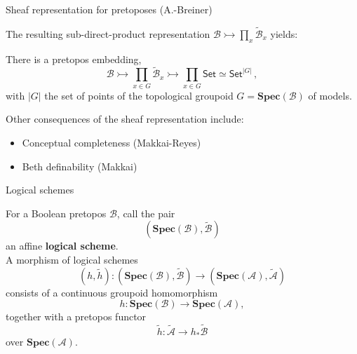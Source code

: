 \documentclass{beamer}
\newcommand{\B}{\ensuremath{\mathcal{B}}}
\newcommand{\myemph}[1]{\textbf{#1}}    %
\newcommand{\Set}{\mathsf{Set}}
\begin{document}
\begin{frame}{Sheaf representation for pretoposes (A.-Breiner)}

The resulting sub-direct-product representation $\mathcal{B}\rightarrowtail \prod_{x}\tilde{\mathcal{B}}_x$ yields:\\[1ex]

\begin{corollary} 
There is a pretopos embedding,
\[
\mathcal{B}\rightarrowtail \prod_{x\in G}\tilde{\mathcal{B}}_{x} \rightarrowtail \prod_{x\in G}\Set \simeq \Set^{|G|}\,,
\]
with $|G|$ the set of points of the topological groupoid $G = \mathbf{Spec}(\mathcal{B})$ of models.
\end{corollary}
\medskip

Other consequences of the sheaf representation include:

\begin{itemize}
\item Conceptual completeness (Makkai-Reyes)
\item Beth definability (Makkai)
\end{itemize}


\end{frame}
\begin{frame}{Logical schemes}

For a Boolean pretopos $\B$, call the pair $$(\mathbf{Spec}(\mathcal{B}), \tilde{\mathcal{B}})$$ an affine \myemph{logical scheme}.  \\

A morphism of logical schemes
\[
(h, \tilde{h}) : (\mathbf{Spec}(\mathcal{B}), \tilde{\mathcal{B}}) \to (\mathbf{Spec}(\mathcal{A}), \tilde{\mathcal{A}})
\]
consists of a continuous groupoid homomorphism 
\[
h : \mathbf{Spec}(\mathcal{B}) \to \mathbf{Spec}(\mathcal{A}),
\]
together with a pretopos functor 
\[
\tilde{h} : \tilde{\mathcal{A}} \to h_*\tilde{\mathcal{B}}
\]
over $\mathbf{Spec}(\mathcal{A})$.

\end{frame}
\end{document}
